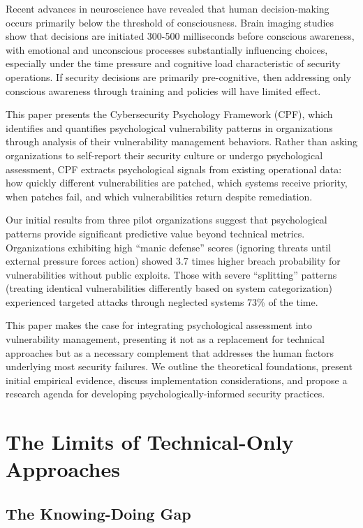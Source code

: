 \documentclass[11pt,a4paper]{article}
\begin{document}
Recent advances in neuroscience have revealed that human decision-making occurs primarily below the threshold of consciousness\cite{libet1983,soon2008}. Brain imaging studies show that decisions are initiated 300-500 milliseconds before conscious awareness, with emotional and unconscious processes substantially influencing choices, especially under the time pressure and cognitive load characteristic of security operations. If security decisions are primarily pre-cognitive, then addressing only conscious awareness through training and policies will have limited effect.

This paper presents the Cybersecurity Psychology Framework (CPF), which identifies and quantifies psychological vulnerability patterns in organizations through analysis of their vulnerability management behaviors. Rather than asking organizations to self-report their security culture or undergo psychological assessment, CPF extracts psychological signals from existing operational data: how quickly different vulnerabilities are patched, which systems receive priority, when patches fail, and which vulnerabilities return despite remediation.

Our initial results from three pilot organizations suggest that psychological patterns provide significant predictive value beyond technical metrics. Organizations exhibiting high ``manic defense'' scores (ignoring threats until external pressure forces action) showed 3.7 times higher breach probability for vulnerabilities without public exploits. Those with severe ``splitting'' patterns (treating identical vulnerabilities differently based on system categorization) experienced targeted attacks through neglected systems 73\% of the time.

This paper makes the case for integrating psychological assessment into vulnerability management, presenting it not as a replacement for technical approaches but as a necessary complement that addresses the human factors underlying most security failures. We outline the theoretical foundations, present initial empirical evidence, discuss implementation considerations, and propose a research agenda for developing psychologically-informed security practices.

\section{The Limits of Technical-Only Approaches}

\subsection{The Knowing-Doing Gap}
\end{document}
